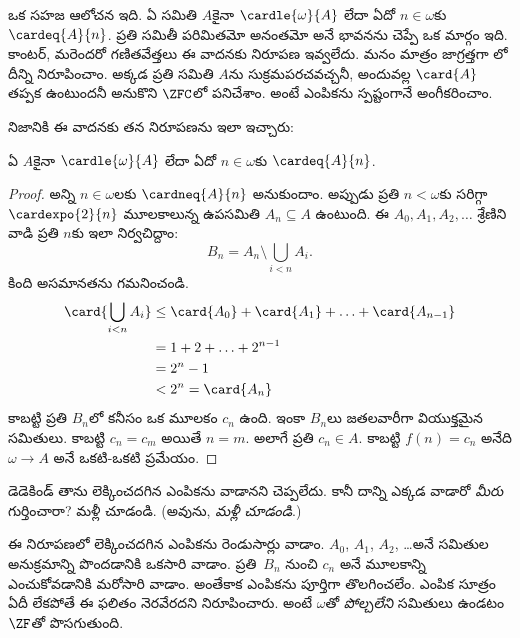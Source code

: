 \documentclass[../../../include/open-logic-section]{subfiles}
\begin{document}
\begin{ex}
ఒక సహజ ఆలోచన ఇది. ఏ సమితి $A$కైనా
$\cardle{\omega}{A}$ లేదా ఏదో $n \in \omega$కు
$\cardeq{A}{n}$. ప్రతి సమితీ పరిమితమో అనంతమో అనే
భావనను చెప్పే ఒక మార్గం ఇది. కాంటర్, మరెందరో గణితవేత్తలు
ఈ వాదనకు నిరూపణ ఇవ్వలేదు. మనం మాత్రం జాగ్రత్తగా
లో
దీన్ని నిరూపించాం. అక్కడ ప్రతి సమితి $A$ను సుక్రమపరచవచ్చనీ,
అందువల్ల $\card{A}$ తప్పక ఉంటుందనీ అనుకొని $\ZFC$లో
పనిచేశాం. అంటే ఎంపికను స్పష్టంగానే అంగీకరించాం.

నిజానికి \citet{Dedekind1888} ఈ వాదనకు తన నిరూపణను ఇలా ఇచ్చారు:

\begin{thm}
ఏ $A$కైనా $\cardle{\omega}{A}$ లేదా ఏదో $n \in \omega$కు $\cardeq{A}{n}$.
\end{thm}

\begin{proof}
అన్ని $n \in \omega$లకు $\cardneq{A}{n}$ అనుకుందాం. అప్పుడు ప్రతి $n < \omega$కు సరిగ్గా $\cardexpo{2}{n}$ మూలకాలున్న ఉపసమితి $A_n \subseteq A$ ఉంటుంది. ఈ $A_0, A_1, A_2,
\ldots$ శ్రేణిని వాడి ప్రతి $n$కు ఇలా నిర్వచిద్దాం:
\[
	B_n = A_n \setminus \bigcup_{i < n} A_i.
\]
కింది అసమానతను గమనించండి.
\begin{align*}
	\card{\bigcup_{i < n}A_i} 
	&\leq \card{A_0} + \card{A_1} + \ldots + \card{A_{n-1}}\\
	&=1 + 2 + \ldots + 2^{n-1}\\
	& = 2^n - 1\\
	& < 2^n = \card{A_n}
\end{align*}
కాబట్టి ప్రతి $B_n$లో కనీసం ఒక మూలకం $c_n$ ఉంది. ఇంకా $B_n$లు జతలవారీగా వియుక్తమైన సమితులు. కాబట్టి $c_n = c_m$ అయితే $n = m$. అలాగే ప్రతి $c_n
\in A$. కాబట్టి $f(n) = c_n$ అనేది $\omega \to A$ అనే ఒకటి-ఒకటి ప్రమేయం.
\end{proof}
\noindent
డెడెకిండ్ తాను లెక్కించదగిన ఎంపికను వాడానని చెప్పలేదు. కానీ దాన్ని ఎక్కడ వాడారో \emph{మీరు} గుర్తించారా? మళ్లీ చూడండి. (అవును, \emph{మళ్లీ చూడండి}.)

ఈ నిరూపణలో లెక్కించదగిన ఎంపికను రెండుసార్లు వాడాం.
$A_0$, $A_1$, $A_2$, \dots\@ అనే సమితుల అనుక్రమాన్ని
పొందడానికి ఒకసారి వాడాం. ప్రతి~$B_n$ నుంచి $c_n$ అనే
మూలకాన్ని ఎంచుకోవడానికి మరోసారి వాడాం. అంతేకాక
ఎంపికను పూర్తిగా తొలగించలేం. ఎంపిక సూత్రం ఏదీ లేకపోతే
ఈ ఫలితం నెరవేరదని \citet[p.~138]{Cohen1966} నిరూపించారు.
అంటే $\omega$తో \emph{పోల్చలేని} సమితులు ఉండటం $\ZF$తో
పొసగుతుంది.
\end{ex}
\end{document}
